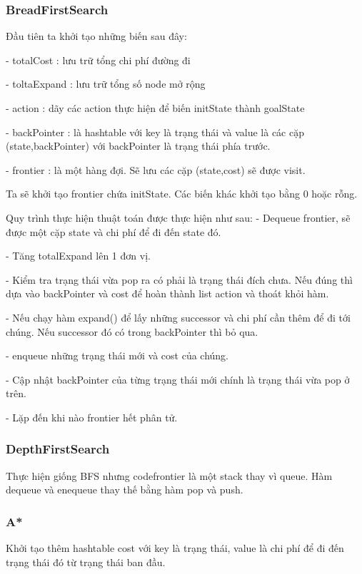 \documentclass[11pt]{scrartcl} %
\begin{document}
\subsubsection{BreadFirstSearch}
Đầu tiên ta khởi tạo những biến sau đây:  

- totalCost : lưu trữ tổng chi phí đường đi  

- toltaExpand : lưu trữ tổng số node mở rộng  

- action : dãy các action thực hiện để biến initState thành goalState  

- backPointer : là hashtable với key là trạng thái và value là các cặp (state,backPointer) với backPointer là trạng thái phía trước.  

- frontier : là một hàng đợi. Sẽ lưu các cặp (state,cost) sẽ được visit.  

Ta sẽ khởi tạo frontier chứa initState. Các biến khác khởi tạo bằng 0 hoặc rỗng.  

Quy trình thực hiện thuật toán được thực hiện như sau:
- Dequeue frontier, sẽ được một cặp state và chi phí để đi đến state đó.

- Tăng totalExpand lên 1 đơn vị.  

- Kiểm tra trạng thái vừa pop ra có phải là trạng thái đích chưa. Nếu đúng thì dựa vào backPointer và cost để hoàn thành list action và thoát khỏi hàm.  

- Nếu chạy hàm expand() để lấy những successor và chi phí cần thêm để đi tới chúng. Nếu successor đó có trong backPointer thì bỏ qua.

- enqueue những trạng thái mới và cost của chúng.

- Cập nhật backPointer của từng trạng thái mới chính là trạng thái vừa pop ở trên.

- Lặp đến khi nào frontier hết phân tử.

\subsubsection{DepthFirstSearch}

Thực hiện giống BFS nhưng code{frontier} là một stack thay vì queue. Hàm dequeue và enequeue thay thế bằng hàm pop và push.

\subsubsection{A*}
Khởi tạo thêm hashtable cost với key là trạng thái, value là chi phí để đi đến trạng thái đó từ trạng thái ban đầu.
\end{document}
